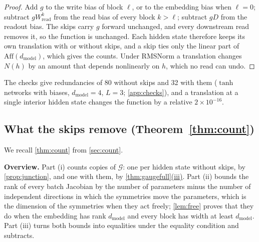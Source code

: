 \documentclass[10pt]{article}
\theoremstyle{definition}
\theoremstyle{remark}
\newcommand{\Wread}{W_{\mathrm{read}}}
\newcommand{\dm}{d_{\mathrm{model}}}
\newcommand{\Aff}{\mathrm{Aff}}
\newcommand{\G}{\mathcal{G}}
\newcommand{\para}[1]{\smallskip\noindent\textbf{#1}\hspace{0.5em}}
\DeclareRobustCommand{\cpref}[2]{\hyperref[#1:#2]{\cref*{#1}(#2)}}
\begin{document}
\begin{proof}
Add $g$ to the write bias of block $\ell$, or to the embedding bias when $\ell = 0$; subtract $g\Wread^{k}$ from the read bias of every block $k > \ell$; subtract $gD$ from the readout bias. The skips carry $g$ forward unchanged, and every downstream read removes it, so the function is unchanged. Each hidden state therefore keeps its own translation with or without skips, and a skip ties only the linear part of $\Aff(\dm)$, which gives the counts. Under RMSNorm a translation changes $N(h)$ by an amount that depends nonlinearly on $h$, which no read can undo.
\end{proof}

The checks give redundancies of 80 without skips and 32 with them ($\tanh$ networks with biases, $\dm = 4$, $L = 3$; \cref{app:checks}), and a translation at a single interior hidden state changes the function by a relative $2\times10^{-16}$.

\subsection{What the skips remove\texorpdfstring{ (Theorem~\ref*{thm:count})}{}}\label{app:prf-count}

We recall \cref{thm:count} from \cref{sec:count}.
\thmCount*

\para{Overview.} Part (i) counts copies of $\G$: one per hidden state without skips, by \cref{prop:junction}, and one with them, by \cpref{thm:gaugefull}{iii}. Part (ii) bounds the rank of every batch Jacobian by the number of parameters minus the number of independent directions in which the symmetries move the parameters, which is the dimension of the symmetries when they act freely; \cref{lem:free} proves that they do when the embedding has rank $\dm$ and every block has width at least $\dm$. Part (iii) turns both bounds into equalities under the equality condition and subtracts.
\end{document}
